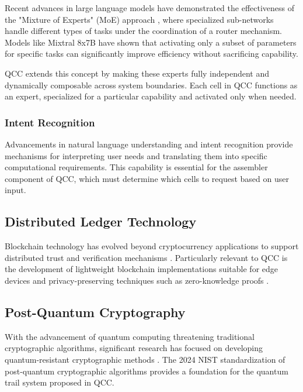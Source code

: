 \documentclass[11pt,a4paper]{article}
\begin{document}
Recent advances in large language models have demonstrated the effectiveness of the "Mixture of Experts" (MoE) approach \cite{MOE}, where specialized sub-networks handle different types of tasks under the coordination of a router mechanism. Models like Mixtral 8x7B \cite{mixtral} have shown that activating only a subset of parameters for specific tasks can significantly improve efficiency without sacrificing capability.

QCC extends this concept by making these experts fully independent and dynamically composable across system boundaries. Each cell in QCC functions as an expert, specialized for a particular capability and activated only when needed.

\subsubsection{Intent Recognition}

Advancements in natural language understanding and intent recognition \cite{intent} provide mechanisms for interpreting user needs and translating them into specific computational requirements. This capability is essential for the assembler component of QCC, which must determine which cells to request based on user input.

\subsection{Distributed Ledger Technology}

Blockchain technology has evolved beyond cryptocurrency applications to support distributed trust and verification mechanisms \cite{blockchain}. Particularly relevant to QCC is the development of lightweight blockchain implementations suitable for edge devices \cite{lightchain} and privacy-preserving techniques such as zero-knowledge proofs \cite{zkp}.

\subsection{Post-Quantum Cryptography}

With the advancement of quantum computing threatening traditional cryptographic algorithms, significant research has focused on developing quantum-resistant cryptographic methods \cite{pqc}. The 2024 NIST standardization of post-quantum cryptographic algorithms \cite{nist} provides a foundation for the quantum trail system proposed in QCC.
\end{document}
